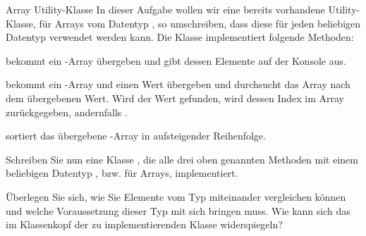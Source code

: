 \documentclass{../tuda-exercise}
\begin{document}
  \begin{task}[credit=\stars{2}{3}]{Array Utility-Klasse}
    In dieser Aufgabe wollen wir eine bereits vorhandene Utility-Klasse, für Arrays vom Datentyp
    , so umschreiben, dass diese für jeden beliebigen Datentyp verwendet werden
    kann. Die Klasse  implementiert folgende Methoden:

    \br

     bekommt ein -Array übergeben und
    gibt dessen Elemente auf der Konsole aus.

    

     bekommt ein -Array und
    einen Wert übergeben und durchsucht das Array nach dem übergebenen Wert. Wird der Wert
    gefunden, wird dessen Index im Array zurückgegeben, andernfalls .

    

     sortiert das übergebene -Array in
    aufsteigender
    Reihenfolge.

    

    \clearpage

    Schreiben Sie nun eine Klasse , die alle drei oben genannten
    Methoden mit einem beliebigen Datentyp , bzw.  für Arrays,
    implementiert.

    \begin{note}[title=Hinweis:, color=tuda-orange]
      Überlegen Sie sich, wie Sie Elemente vom Typ  miteinander vergleichen können
      und welche Voraussetzung dieser Typ  mit sich bringen muss. Wie kann sich das
      im Klassenkopf der zu implementierenden Klasse widerspiegeln?
    \end{note}

    \begin{solution}
      

      \clearpage

      
    \end{solution}
  \end{task}
\end{document}

